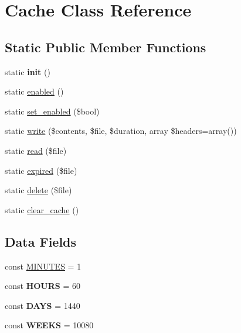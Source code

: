 \hypertarget{class_cache}{
\section{Cache Class Reference}
\label{class_cache}
}
\subsection*{Static Public Member Functions}
\begin{DoxyCompactItemize}
\item 
\hypertarget{class_cache_a9f0be6ae273d3669e11c29910a0be338}{
static {\bfseries init} ()}
\label{class_cache_a9f0be6ae273d3669e11c29910a0be338}

\item 
static \hyperlink{class_cache_a6b09fd0540f8d04cc8441c3f14ea7181}{enabled} ()
\item 
static \hyperlink{class_cache_a9f1def6fae4447a333307a3e85a44d92}{set\_\-enabled} (\$bool)
\item 
static \hyperlink{class_cache_a7f33c63248074f3bcf164506bdc2173a}{write} (\$contents, \$file, \$duration, array \$headers=array())
\item 
static \hyperlink{class_cache_aaa251a117e5087b977d179a9e933b20f}{read} (\$file)
\item 
static \hyperlink{class_cache_ade5311a5003432124249ff2360b09632}{expired} (\$file)
\item 
static \hyperlink{class_cache_a5bc3a8248b0ac2e90555d3392643e443}{delete} (\$file)
\item 
static \hyperlink{class_cache_a62080e0c2b29627f7b9a662bc1802ace}{clear\_\-cache} ()
\end{DoxyCompactItemize}
\subsection*{Data Fields}
\begin{DoxyCompactItemize}
\item 
const \hyperlink{class_cache_adf679c9dc5e14af2dc7ba9b332d3fae0}{MINUTES} = 1
\item 
\hypertarget{class_cache_a2476ba24044af4c7c06fa060b49f75c1}{
const {\bfseries HOURS} = 60}
\label{class_cache_a2476ba24044af4c7c06fa060b49f75c1}

\item 
\hypertarget{class_cache_af093acdd4cf8cb2ac82aa4521a0a940e}{
const {\bfseries DAYS} = 1440}
\label{class_cache_af093acdd4cf8cb2ac82aa4521a0a940e}

\item 
\hypertarget{class_cache_af782850f5509ffc2a49d5332a8f06ddb}{
const {\bfseries WEEKS} = 10080}
\label{class_cache_af782850f5509ffc2a49d5332a8f06ddb}

\end{DoxyCompactItemize}
